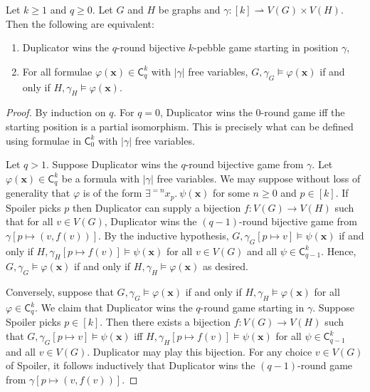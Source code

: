 \documentclass[a4paper,UKenglish,cleveref, autoref, thm-restate]{lipics-v2021}
\renewcommand{\phi}{\varphi}
\begin{document}
\begin{theorem} \label{thm:hella}
	Let $k\geq 1$ and $q \geq 0$. Let $G$ and $H$ be graphs and $\gamma \colon [k] \rightharpoonup V(G) \times V(H)$. Then the following are equivalent:
	\begin{enumerate}
		\item Duplicator wins the $q$-round bijective $k$-pebble game starting in position $\gamma$,
		\item For all formulae $\phi(\boldsymbol{x}) \in \mathsf{C}^k_q$ with $|\gamma|$ free variables, $G, \gamma_G \models \phi(\boldsymbol{x})$ if and only if $H, \gamma_H \models \phi(\boldsymbol{x})$.
	\end{enumerate}
\end{theorem}
\begin{proof}
	By induction on $q$. For $q = 0$, Duplicator wins the $0$-round game iff the starting position is a partial isomorphism. This is precisely what can be defined using formulae in $\mathsf{C}^{k}_0$ with $|\gamma|$ free variables.
	
	Let $q > 1$. Suppose Duplicator wins the $q$-round bijective game from $\gamma$. Let $\phi(\boldsymbol{x}) \in \mathsf{C}^k_q$ be a formula with $|\gamma|$ free variables. We may suppose without loss of generality that $\phi$ is of the form $\exists^{=n} x_p.\ \psi(\boldsymbol{x})$ for some $n \geq 0$ and $p \in [k]$. If Spoiler picks $p$ then Duplicator can supply a bijection $f \colon V(G) \to V(H)$ such that for all $v \in V(G)$, Duplicator wins the $(q-1)$-round bijective game from $\gamma[p \mapsto (v, f(v))]$. By the inductive hypothesis, $G, \gamma_G[p \mapsto v] \models \psi(\boldsymbol{x})$ if and only if $H, \gamma_H[p \mapsto f(v)] \models \psi(\boldsymbol{x})$ for all $v \in V(G)$ and all $\psi \in \mathsf{C}^k_{q-1}$. Hence, $G, \gamma_G \models \phi(\boldsymbol{x})$ if and only if $H,\gamma_H \models \phi(\boldsymbol{x})$ as desired.
	
	Conversely, suppose that $G, \gamma_G \models \phi(\boldsymbol{x})$ if and only if $H, \gamma_H \models \phi(\boldsymbol{x})$ for all $\phi \in \mathsf{C}^k_q$.
	We claim that Duplicator wins the $q$-round game starting in $\gamma$.
	Suppose Spoiler picks $p \in [k]$.
Then there exists a bijection $f \colon V(G) \to V(H)$ such that $G, \gamma_G[p \mapsto v] \models \psi(\boldsymbol{x})$ iff $H, \gamma_H[p \mapsto f(v)] \models \psi(\boldsymbol{x})$ for all $\psi \in \mathsf{C}^k_{q-1}$ and all $v \in V(G)$.
Duplicator may play this bijection. For any choice $v \in V(G)$ of Spoiler, it follows inductively that Duplicator wins the $(q-1)$-round game from $\gamma[p \mapsto (v, f(v))]$.
\end{proof}
\end{document}
